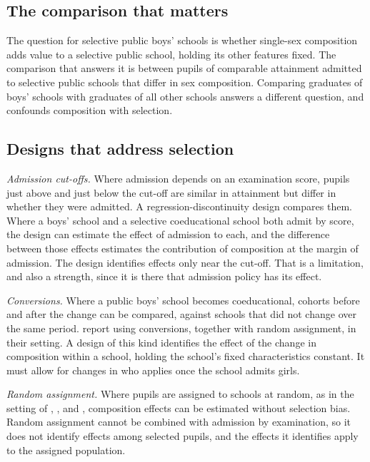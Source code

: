 \documentclass[11pt]{article}
\begin{document}
\subsection{The comparison that matters}

The question for selective public boys' schools is whether single-sex composition adds value to a selective public school, holding its other features fixed. The comparison that answers it is between pupils of comparable attainment admitted to selective public schools that differ in sex composition. Comparing graduates of boys' schools with graduates of all other schools answers a different question, and confounds composition with selection.

\subsection{Designs that address selection}

\emph{Admission cut-offs.} Where admission depends on an examination score, pupils just above and just below the cut-off are similar in attainment but differ in whether they were admitted. A regression-discontinuity design compares them. Where a boys' school and a selective coeducational school both admit by score, the design can estimate the effect of admission to each, and the difference between those effects estimates the contribution of composition at the margin of admission. The design identifies effects only near the cut-off. That is a limitation, and also a strength, since it is there that admission policy has its effect.

\emph{Conversions.} Where a public boys' school becomes coeducational, cohorts before and after the change can be compared, against schools that did not change over the same period. \citet{dustmann2017} report using conversions, together with random assignment, in their setting. A design of this kind identifies the effect of the change in composition within a school, holding the school's fixed characteristics constant. It must allow for changes in who applies once the school admits girls.

\emph{Random assignment.} Where pupils are assigned to schools at random, as in the setting of \citet{park2012}, \citet{dustmann2017}, \citet{lee2021} and \citet{leenakazawa2021}, composition effects can be estimated without selection bias. Random assignment cannot be combined with admission by examination, so it does not identify effects among selected pupils, and the effects it identifies apply to the assigned population.
\end{document}
